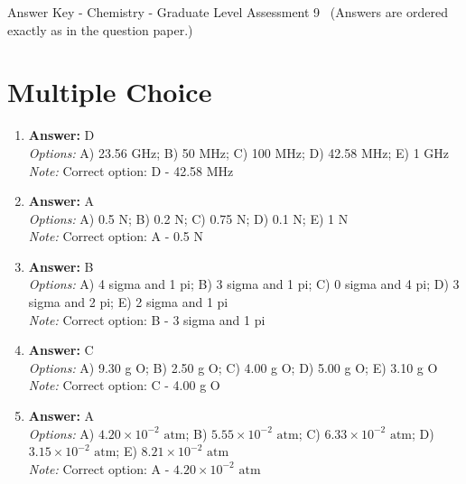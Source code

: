 \documentclass[12pt]{article}
\begin{document}
\begin{center}
Answer Key - Chemistry - Graduate Level Assessment 9 \
\small (Answers are ordered exactly as in the question paper.)
\end{center}

\section*{Multiple Choice}
\begin{enumerate}[label=\arabic*.]
\item \textbf{Answer:} D
\\ \textit{Options:} A) 23.56 GHz; B) 50 MHz; C) 100 MHz; D) 42.58 MHz; E) 1 GHz
\\ \textit{Note:} Correct option: D - 42.58 MHz
\item \textbf{Answer:} A
\\ \textit{Options:} A) 0.5 N; B) 0.2 N; C) 0.75 N; D) 0.1 N; E) 1 N
\\ \textit{Note:} Correct option: A - 0.5 N
\item \textbf{Answer:} B
\\ \textit{Options:} A) 4 sigma and 1 pi; B) 3 sigma and 1 pi; C) 0 sigma and 4 pi; D) 3 sigma and 2 pi; E) 2 sigma and 1 pi
\\ \textit{Note:} Correct option: B - 3 sigma and 1 pi
\item \textbf{Answer:} C
\\ \textit{Options:} A) 9.30 g O; B) 2.50 g O; C) 4.00 g O; D) 5.00 g O; E) 3.10 g O
\\ \textit{Note:} Correct option: C - 4.00 g O
\item \textbf{Answer:} A
\\ \textit{Options:} A) $4.20 \times 10^{-2}$ $\text{atm}$; B) $5.55 \times 10^{-2}$ $\text{atm}$; C) $6.33 \times 10^{-2}$ $\text{atm}$; D) $3.15 \times 10^{-2}$ $\text{atm}$; E) $8.21 \times 10^{-2}$ $\text{atm}$
\\ \textit{Note:} Correct option: A - $4.20 \times 10^{-2}$ $\text{atm}$
\end{enumerate}
\end{document}
